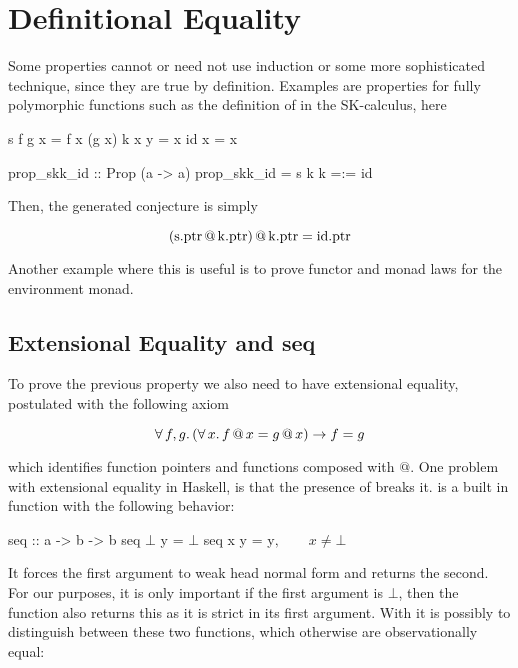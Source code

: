 \section{Definitional Equality}
\label{sec:equality}

Some properties cannot or need not use induction or some more
sophisticated technique, since they are true by definition. Examples
are properties for fully polymorphic functions such as the definition
of  in the SK-calculus, here

\begin{code}
s f g x = f x (g x)
k x y = x
id x = x

prop_skk_id :: Prop (a -> a)
prop_skk_id = s k k =:= id
\end{code}

Then, the generated conjecture is simply

\begin{equation*}
(\mathrm{s.ptr} \, @ \, \mathrm{k.ptr} )
     \, @ \, \mathrm{k.ptr} = \mathrm{id.ptr}
\end{equation*}

Another example where this is useful is to prove functor and monad
laws for the environment monad.

\subsection{Extensional Equality and seq}

To prove the previous property we also need to have extensional
equality, postulated with the following axiom

\begin{equation*}
\forall \, f , g . \, (\forall \, x . \, f \, @ \, x = g \, @ \, x) \rightarrow f = g
\end{equation*}

\noindent
which identifies function pointers and functions composed with $@$.
One problem with extensional equality in Haskell, is that the presence
of  breaks it.  is a built in function with the
following behavior:

\begin{code}[mathescape]
seq :: a -> b -> b
seq $\bot$ y = $\bot$
seq x y = y$, \qquad x \neq \bot$
\end{code}

It forces the first argument to weak head normal form and returns the
second. For our purposes, it is only important if the first argument
is $\bot$, then the function also returns this as it is strict in its
first argument. With  it is possibly to distinguish between
these two functions, which otherwise are observationally equal:

